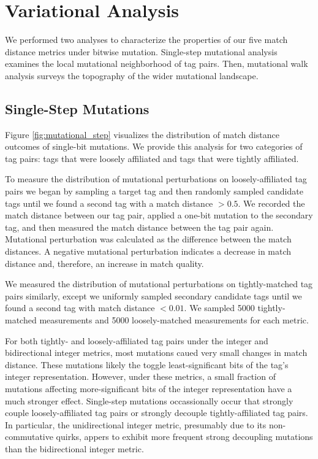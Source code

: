 \section{Variational Analysis} \label{sec:variational}

We performed two analyses to characterize the properties of our five match distance metrics under bitwise mutation.
Single-step mutational analysis examines the local mutational neighborhood of tag pairs.
Then, mutational walk analysis surveys the topography of the wider mutational landscape.

\subsection{Single-Step Mutations}



Figure \ref{fig:mutational_step} visualizes the distribution of match distance outcomes of single-bit mutations.
We provide this analysis for two categories of tag pairs: tags that were loosely affiliated and tags that were tightly affiliated.

To measure the distribution of mutational perturbations on loosely-affiliated tag pairs we began by sampling a target tag and then randomly sampled candidate tags until we found a second tag with a match distance $> 0.5$.
We recorded the match distance between our tag pair, applied a one-bit mutation to the secondary tag, and then measured the match distance between the tag pair again.
Mutational perturbation was calculated as the difference between the match distances.
A negative mutational perturbation indicates a decrease in match distance and, therefore, an increase in match quality.

We measured the distribution of mutational perturbations on tightly-matched tag pairs similarly, except we uniformly sampled secondary candidate tags until we found a second tag with match distance $< 0.01$.
We sampled 5000 tightly-matched measurements and 5000 loosely-matched measurements for each metric.

For both tightly- and loosely-affiliated tag pairs under the integer and bidirectional integer metrics, most mutations caued very small changes in match distance.
These mutations likely the toggle least-significant bits of the tag's integer representation.
However, under these metrics, a small fraction of mutations affecting more-significant bits of the integer representation have a much stronger effect.
Single-step mutations occassionally occur that strongly couple loosely-affiliated tag pairs or strongly decouple tightly-affiliated tag pairs.
In particular, the unidirectional integer metric, presumably due to its non-commutative quirks, appers to exhibit more frequent strong decoupling mutations than the bidirectional integer metric.

